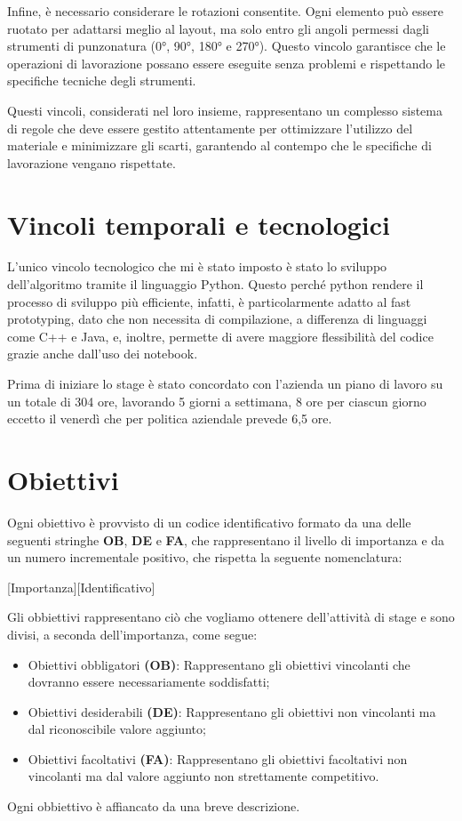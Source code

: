 Infine, è necessario considerare le rotazioni consentite. Ogni elemento può essere ruotato per adattarsi meglio al layout, ma solo entro gli angoli permessi dagli strumenti di punzonatura (0°, 90°, 180° e 270°). Questo vincolo garantisce che le operazioni di lavorazione possano essere eseguite senza problemi e rispettando le specifiche tecniche degli strumenti.

Questi vincoli, considerati nel loro insieme, rappresentano un complesso sistema di regole che deve essere gestito attentamente per ottimizzare l’utilizzo del materiale e minimizzare gli scarti, garantendo al contempo che le specifiche di lavorazione vengano rispettate.

\section{Vincoli temporali e tecnologici}

L'unico vincolo tecnologico che mi è stato imposto è stato lo sviluppo dell'algoritmo tramite il linguaggio Python. Questo perché python rendere il processo di sviluppo più efficiente, infatti, è particolarmente adatto al fast prototyping, dato che non necessita di compilazione, a differenza di linguaggi come C++ e Java, e, inoltre, permette di avere maggiore flessibilità del codice grazie anche dall'uso dei notebook.

Prima di iniziare lo stage è stato concordato con l’azienda un piano di lavoro su un totale di 304 ore, lavorando 5 giorni a settimana, 8 ore per ciascun giorno eccetto il venerdì che per politica aziendale prevede 6,5 ore. 

\section{Obiettivi}

Ogni obiettivo è provvisto di un codice identificativo formato da una delle seguenti stringhe \textbf{OB}, \textbf{DE} e \textbf{FA}, che rappresentano il livello di importanza e da un numero incrementale positivo, che rispetta la seguente nomenclatura:
\begin{center}
    [Importanza][Identificativo]
\end{center}
Gli obbiettivi rappresentano ciò che vogliamo ottenere dell'attività di stage e sono divisi, a seconda dell'importanza, come segue:
\begin{itemize}
    \item Obiettivi obbligatori \textbf{(OB)}: 
    Rappresentano gli obiettivi vincolanti che dovranno essere necessariamente soddisfatti;
    \item Obiettivi desiderabili \textbf{(DE)}:
    Rappresentano gli obiettivi non vincolanti ma dal riconoscibile valore aggiunto;
    \item Obiettivi facoltativi \textbf{(FA)}:
    Rappresentano gli obiettivi facoltativi non vincolanti ma dal valore aggiunto non strettamente competitivo.
\end{itemize}
Ogni obbiettivo è affiancato da una breve descrizione.


